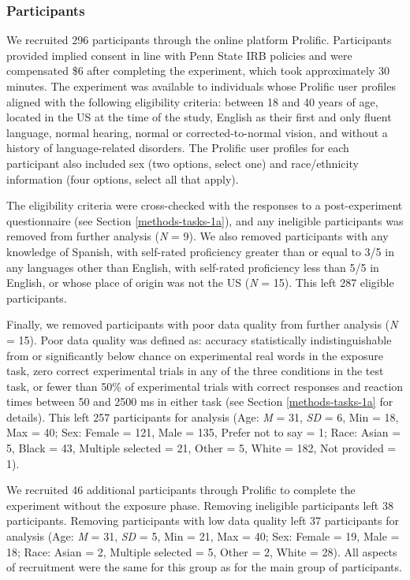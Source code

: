 \documentclass[preprint, 3p, authoryear]{elsarticle} %
\begin{document}
\hypertarget{methods-pars-1a}{%
\subsubsection{Participants}\label{methods-pars-1a}}

We recruited 296 participants through the online platform Prolific.
Participants provided implied consent in line with Penn State IRB policies and were compensated \$6 after completing the experiment, which took approximately 30 minutes.
The experiment was available to individuals whose Prolific user profiles aligned with the following eligibility criteria: between 18 and 40 years of age, located in the US at the time of the study, English as their first and only fluent language, normal hearing, normal or corrected-to-normal vision, and without a history of language-related disorders.
The Prolific user profiles for each participant also included sex (two options, select one) and race/ethnicity information (four options, select all that apply).

The eligibility criteria were cross-checked with the responses to a post-experiment questionnaire (see Section \ref{methods-tasks-1a}), and any ineligible participants was removed from further analysis (\emph{N} = 9).
We also removed participants with any knowledge of Spanish, with self-rated proficiency greater than or equal to 3/5 in any languages other than English, with self-rated proficiency less than 5/5 in English, or whose place of origin was not the US (\emph{N} = 15).
This left 287 eligible participants.

Finally, we removed participants with poor data quality from further analysis (\emph{N} = 15).
Poor data quality was defined as: accuracy statistically indistinguishable from or significantly below chance on experimental real words in the exposure task, zero correct experimental trials in any of the three conditions in the test task, or fewer than 50\% of experimental trials with correct responses and reaction times between 50 and 2500 ms in either task (see Section \ref{methods-tasks-1a} for details).
This left 257 participants for analysis (Age: \emph{M} = 31, \emph{SD} = 6, Min = 18, Max = 40; Sex: Female = 121, Male = 135, Prefer not to say = 1; Race: Asian = 5, Black = 43, Multiple selected = 21, Other = 5, White = 182, Not provided = 1).

We recruited 46 additional participants through Prolific to complete the experiment without the exposure phase.
Removing ineligible participants left 38 participants.
Removing participants with low data quality left 37 participants for analysis (Age: \emph{M} = 31, \emph{SD} = 5, Min = 21, Max = 40; Sex: Female = 19, Male = 18; Race: Asian = 2, Multiple selected = 5, Other = 2, White = 28).
All aspects of recruitment were the same for this group as for the main group of participants.
\end{document}
